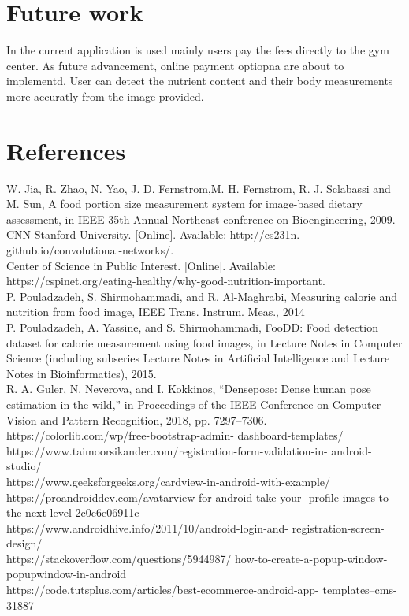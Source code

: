 \documentclass[a4paper,12pt,toc=flat]{report}
\begin{document}
{{		\section{Future work}
		In the current application  is used mainly users pay the fees directly to the gym center. As future advancement, online payment optiopna are about to implementd. User can detect the nutrient content and their body measurements more accuratly from the image provided.
	
	\pagebreak

	


\section{References}

     \subitem[1]     W. Jia, R. Zhao, N. Yao, J. D. Fernstrom,M.
     H. Fernstrom, R. 
	J. Sclabassi and M. Sun, A food portion size measurement system
	 for image-based dietary assessment, in IEEE 35th Annual Northeast
		conference on Bioengineering, 2009.\\
\subitem[2] CNN Stanford University. [Online]. Available: http://cs231n.
		github.io/convolutional-networks/.\\ 
\subitem	[3] Center of Science in Public Interest. [Online]. Available:
	 https://cspinet.org/eating-healthy/why-good-nutrition-important. \\
	\subitem[4] P. Pouladzadeh, S. Shirmohammadi, and R. Al-Maghrabi, 
		Measuring calorie and nutrition from food image, IEEE Trans. 
		Instrum. Meas., 2014\\
\subitem	[5] P. Pouladzadeh, A. Yassine, and S. Shirmohammadi, FooDD: Food 
	detection dataset for calorie measurement using food images, in 
	Lecture Notes in Computer Science (including subseries Lecture 
	Notes in Artificial  Intelligence and Lecture
Notes in Bioinformatics), 2015.\\
\subitem	[6] R. A. Guler, N. Neverova, and I. Kokkinos, “Densepose: 
	Dense human pose estimation in the wild,” in Proceedings of the IEEE 
	Conference on Computer Vision and Pattern Recognition, 2018,
	 pp. 7297–7306.\\
\subitem	[7] https://colorlib.com/wp/free-bootstrap-admin-
		dashboard-templates/\\
\subitem	[8] https://www.taimoorsikander.com/registration-form-validation-in-
		android-studio/\\
\subitem	[9] https://www.geeksforgeeks.org/cardview-in-android-with-example/\\
\pagebreak
\subitem	[10] https://proandroiddev.com/avatarview-for-android-take-your-
	profile-images-to-the-next-level-2c0c6e06911c\\
\subitem	[11]https://www.androidhive.info/2011/10/android-login-and-
	registration-screen-design/\\
\subitem	[12] https://stackoverflow.com/questions/5944987/
		how-to-create-a-popup-window-popupwindow-in-android\\
	\subitem[13]https://code.tutsplus.com/articles/best-ecommerce-android-app-
		templates--cms-31887\\
	
}}
\end{document}
